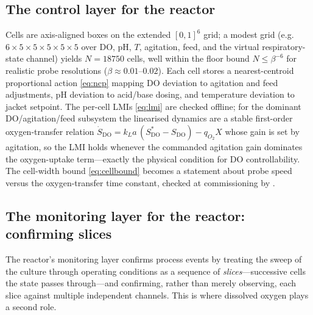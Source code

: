 \documentclass[11pt,a4paper,twocolumn]{article}
\theoremstyle{thmstyle}
\theoremstyle{definition}
\theoremstyle{remark}
\newcommand{\floor}{\beta}
\begin{document}
\subsection{The control layer for the reactor}

Cells are axis-aligned boxes on the extended $[0,1]^6$ grid; a modest grid
(e.g.\ $6\times5\times5\times5\times5\times5$ over DO, pH, $T$, agitation,
feed, and the virtual respiratory-state channel) yields $N=18750$ cells,
well within the floor bound $N\le\floor^{-6}$ for realistic probe
resolutions ($\floor\approx0.01$--$0.02$). Each cell stores a nearest-centroid
proportional action \eqref{eq:ncp} mapping DO deviation to agitation and
feed adjustments, pH deviation to acid/base dosing, and temperature
deviation to jacket setpoint. The per-cell LMIs \eqref{eq:lmi} are checked
offline; for the dominant DO/agitation/feed subsystem the linearised
dynamics are a stable first-order oxygen-transfer relation
$\dot{S}_{\mathrm{DO}}=k_La\,(S^{\ast}_{\mathrm{DO}}-S_{\mathrm{DO}})-q_{O_2}X$
whose gain is set by agitation, so the LMI holds whenever the commanded
agitation gain dominates the oxygen-uptake term---exactly the physical
condition for DO controllability. The cell-width bound \eqref{eq:cellbound}
becomes a statement about probe speed versus the oxygen-transfer time
constant, checked at commissioning by .

\subsection{The monitoring layer for the reactor: confirming slices}

The reactor's monitoring layer confirms process events by treating the
sweep of the culture through operating conditions as a sequence of
\emph{slices}---successive cells the state passes through---and
confirming, rather than merely observing, each slice against multiple
independent channels. This is where dissolved oxygen plays a second role.
\end{document}
